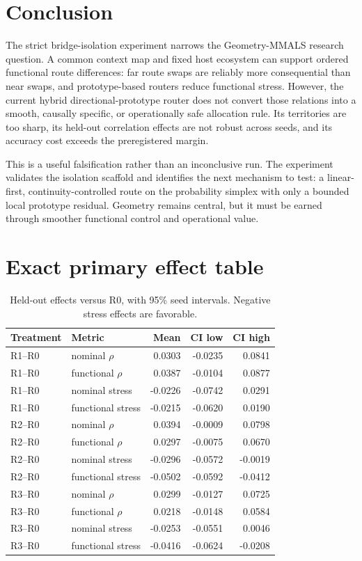 \documentclass[11pt,a4paper]{article}
\begin{document}
\section{Conclusion}
The strict bridge-isolation experiment narrows the Geometry-MMALS research question. A common context map and fixed host ecosystem can support ordered functional route differences: far route swaps are reliably more consequential than near swaps, and prototype-based routers reduce functional stress. However, the current hybrid directional-prototype router does not convert those relations into a smooth, causally specific, or operationally safe allocation rule. Its territories are too sharp, its held-out correlation effects are not robust across seeds, and its accuracy cost exceeds the preregistered margin.

This is a useful falsification rather than an inconclusive run. The experiment validates the isolation scaffold and identifies the next mechanism to test: a linear-first, continuity-controlled route on the probability simplex with only a bounded local prototype residual. Geometry remains central, but it must be earned through smoother functional control and operational value.

\appendix
\section{Exact primary effect table}
\begin{table}[H]
\centering
\caption{Held-out effects versus R0, with 95\% seed intervals. Negative stress effects are favorable.}
\small
\begin{tabular}{@{}llrrr@{}}
\toprule
Treatment & Metric & Mean & CI low & CI high \\
\midrule
R1--R0 & nominal $\rho$ & 0.0303 & -0.0235 & 0.0841 \\
R1--R0 & functional $\rho$ & 0.0387 & -0.0104 & 0.0877 \\
R1--R0 & nominal stress & -0.0226 & -0.0742 & 0.0291 \\
R1--R0 & functional stress & -0.0215 & -0.0620 & 0.0190 \\
R2--R0 & nominal $\rho$ & 0.0394 & -0.0009 & 0.0798 \\
R2--R0 & functional $\rho$ & 0.0297 & -0.0075 & 0.0670 \\
R2--R0 & nominal stress & -0.0296 & -0.0572 & -0.0019 \\
R2--R0 & functional stress & -0.0502 & -0.0592 & -0.0412 \\
R3--R0 & nominal $\rho$ & 0.0299 & -0.0127 & 0.0725 \\
R3--R0 & functional $\rho$ & 0.0218 & -0.0148 & 0.0584 \\
R3--R0 & nominal stress & -0.0253 & -0.0551 & 0.0046 \\
R3--R0 & functional stress & -0.0416 & -0.0624 & -0.0208 \\
\bottomrule
\end{tabular}
\end{table}
\end{document}
